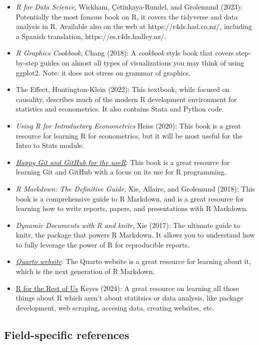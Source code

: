 \documentclass[
  letterpaper,
  DIV=11,
  numbers=noendperiod]{scrartcl}
\begin{document}
\begin{itemize}
\item
  \emph{R for Data Science}, Wickham, Çetinkaya-Rundel, and Grolemund
  (2023): Potentially the most famous book on R, it covers the tidyverse
  and data analysis in R. Available also on the web at
  https://r4ds.had.co.nz/, including a Spanish translation,
  https://es.r4ds.hadley.nz/.
\item
  \emph{R Graphics Cookbook}, Chang (2018): A \emph{cookbook} style book
  that covers step-by-step guides on almost all types of visualizations
  you may think of using ggplot2. Note: it does not stress on grammar of
  graphics.
\item
  The Effect, Huntington-Klein (2022): This textbook, while focused on
  causality, describes much of the modern R development environment for
  statistics and econometrics. It also contains Stata and Python code.
\item
  \emph{Using R for Introductory Econometrics} Heiss (2020): This book
  is a great resource for learning R for econometrics, but it will be
  most useful for the Intro to Stats module.
\item
  \href{https://happygitwithr.com/}{\emph{Happy Git and GitHub for the
  useR}}: This book is a great resource for learning Git and GitHub with
  a focus on its use for R programming.
\item
  \emph{R Markdown: The Definitive Guide}, Xie, Allaire, and Grolemund
  (2018): This book is a comprehensive guide to R Markdown, and is a
  great resource for learning how to write reports, papers, and
  presentations with R Markdown.
\item
  \emph{Dynamic Documents with R and knitr}, Xie (2017): The ultimate
  guide to knitr, the package that powers R Markdown. It allows you to
  understand how to fully leverage the power of R for reproducible
  reports.
\item
  \href{https://quarto.org/}{\emph{Quarto website}}: The Quarto website
  is a great resource for learning about it, which is the next
  generation of R Markdown.
\item
  \href{https://book.rfortherestofus.com/}{R for the Rest of Us} Keyes
  (2024): A great resource on learning all those things about R which
  aren't about statitsics or data analysis, like package development,
  web scraping, accesing data, creating websites, etc.
\end{itemize}

\subsection{Field-specific references}\label{field-specific-references}
\end{document}
